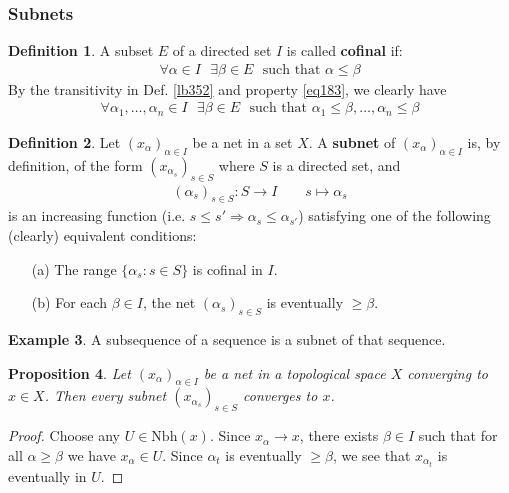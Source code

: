 \documentclass[12pt,b5paper,notitlepage]{article}
\theoremstyle{definition}
\newtheorem{df}{Definition}[subsection]
\newtheorem{eg}[df]{Example}
\theoremstyle{plain}
\newtheorem{pp}[df]{Proposition}
\newcommand{\Nbh}{\mathrm{Nbh}}
\numberwithin{equation}{section}
\begin{document}
\subsubsection{Subnets}

\begin{df}
A subset $E$ of a directed set $I$ is called \textbf{cofinal}  if:
\begin{align*}
\forall\alpha\in I~~~\exists\beta\in E~~~\text{such that }\alpha\leq\beta
\end{align*}
By the transitivity in Def. \ref{lb352} and property \eqref{eq183}, we clearly have
\begin{align*}
\forall\alpha_1,\dots,\alpha_n\in I~~~\exists\beta\in E~~~\text{such that }\alpha_1\leq\beta,\dots,\alpha_n\leq\beta
\end{align*}
\end{df}



\begin{df}
Let $(x_\alpha)_{\alpha\in I}$ be a net in a set $X$. A \textbf{subnet}  of $(x_\alpha)_{\alpha\in I}$ is, by definition, of the form $(x_{\alpha_s})_{s\in S}$ where $S$ is a directed set, and
\begin{align*}
(\alpha_s)_{s\in S}:S\rightarrow I\qquad s\mapsto \alpha_s
\end{align*}
is an increasing function (i.e. $s\leq s'\Rightarrow \alpha_s\leq\alpha_{s'}$) satisfying one of the following (clearly) equivalent conditions:
\begin{enumerate}
\item[(a)] The range $\{\alpha_s:s\in S\}$ is cofinal in $I$.
\item[(b)] For each $\beta\in I$, the net $(\alpha_s)_{s\in S}$ is eventually $\geq\beta$.
\end{enumerate}
\end{df}


\begin{eg}
A subsequence of a sequence is a subnet of that sequence.
\end{eg}


\begin{pp}\label{lb236}
Let $(x_\alpha)_{\alpha\in I}$ be a net in a topological space $X$ converging to $x\in X$. Then every subnet $(x_{\alpha_s})_{s\in S}$ converges to $x$.
\end{pp}

\begin{proof}
Choose any $U\in\Nbh(x)$. Since $x_\alpha\rightarrow x$, there exists $\beta\in I$ such that for all $\alpha\geq\beta$ we have $x_\alpha\in U$. Since $\alpha_t$ is eventually $\geq\beta$, we see that $x_{\alpha_t}$ is eventually in $U$.
\end{proof}
\end{document}
